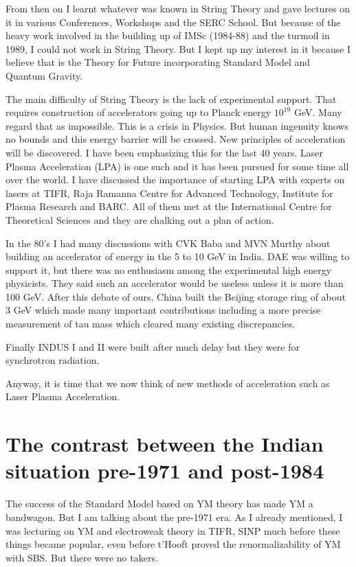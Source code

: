From then on I learnt whatever was known in String Theory and gave 
lectures on it in various Conferences, Workshops and the SERC School. 
But because of the heavy work involved in the building up of IMSc 
(1984-88) and the turmoil in 1989, I could not work in String Theory. 
But I kept up my interest in it because I believe that is the Theory for 
Future incorporating Standard Model and Quantum Gravity.

The main difficulty of String Theory is the lack of experimental 
support. That requires construction of accelerators going up to Planck 
energy $10^{19}$ GeV. Many regard that as impossible. This is a crisis in 
Physics. But human ingenuity knows no bounds and this energy barrier 
will be crossed. New principles of acceleration will be discovered. I 
have been emphasizing this for the last 40 years. Laser Plasma 
Acceleration (LPA) is one such and it has been pursued for some time all 
over the world. I have discussed the importance of starting LPA with 
experts on lasers at TIFR, Raja Ramanna Centre for Advanced Technology, 
Institute for Plasma Research and BARC. All of them met at the 
International Centre for Theoretical Sciences and they are chalking out 
a plan of action.

In the 80's I had many discussions with CVK Baba and MVN Murthy about 
building an accelerator of energy in the 5 to 10 GeV in India. DAE was 
willing to support it, but there was no enthusiasm among the 
experimental high energy physicists. They said such an accelerator would 
be useless unless it is more than 100 GeV. After this debate of ours, 
China built the Beijing storage ring of about 3 GeV which made many 
important contributions including a more precise measurement of tau mass 
which cleared many existing discrepancies.

Finally INDUS I and II were built after much delay but they were for 
synchrotron radiation.

Anyway, it is time that we now think of new methods of acceleration such 
as Laser Plasma Acceleration.


\section*{The contrast between the Indian situation pre-1971 and post-1984}

The success of the Standard Model based on YM theory has made YM a 
bandwagon. But I am talking about the pre-1971 era. As I already 
mentioned, I was lecturing on YM and electroweak theory in TIFR, SINP 
much before these things became popular, even before t'Hooft proved the 
renormalizability of YM with SBS. But there were no takers.

